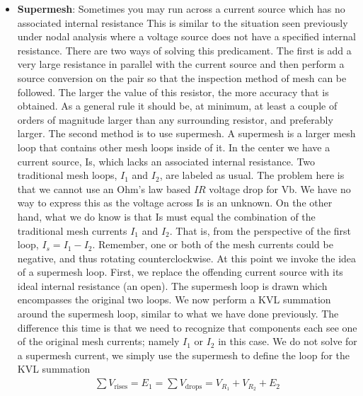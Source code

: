 \documentclass{report}
\begin{document}
\begin{itemize}
\begin{align*}
            .\end{align*}
        \item \textbf{Supermesh}: Sometimes you may run across a current source which has no associated internal resistance
            \bigbreak \noindent 
            This is similar to the situation seen previously under nodal analysis where a voltage source does not have a specified internal resistance. There are two ways of solving this predicament. The first is add a very large resistance in parallel with the current source and then perform a source conversion on the pair so that the inspection method of mesh can be followed. The larger the value of this resistor, the more accuracy that is obtained. As a general rule it should be, at minimum, at least a couple of orders of magnitude larger than any surrounding resistor, and preferably larger. The second method is to use supermesh. A supermesh is a larger mesh loop that contains other mesh loops inside of it.
            \bigbreak \noindent 
            \bigbreak \noindent 
            In the center we have a current source, Is, which lacks an associated internal resistance. Two traditional mesh loops, $I_1$ and $I_2$, are labeled as usual. The problem here is that we cannot use an Ohm's law based $IR$ voltage drop for Vb. We have no way to express this as the voltage across Is is an unknown. On the other hand, what we do know is that Is must equal the combination of the traditional mesh currents $I_1$ and $I_2$. That is, from the perspective of the first loop, $I_{s} = I_{1} - I_{2}$. Remember, one or both of the mesh currents could be negative, and thus rotating counterclockwise.
            \bigbreak \noindent 
            At this point we invoke the idea of a supermesh loop. First, we replace the offending current source with its ideal internal resistance (an open). The supermesh loop is drawn which encompasses the original two loops.
            \bigbreak \noindent 
            \bigbreak \noindent 
            We now perform a KVL summation around the supermesh loop, similar to what we have done previously. The difference this time is that we need to recognize that components each see one of the original mesh currents; namely $I_1$ or $I_2$ in this case. We do not solve for a supermesh current, we simply use the supermesh to define the loop for the KVL summation
            \begin{align*}
                \sum V_{\text{rises}} = E_{1} = \sum V_{\text{drops}} = V_{R_{1}} + V_{R_{2}} + E_{2}

\end{align*}
\end{itemize}
\end{document}
